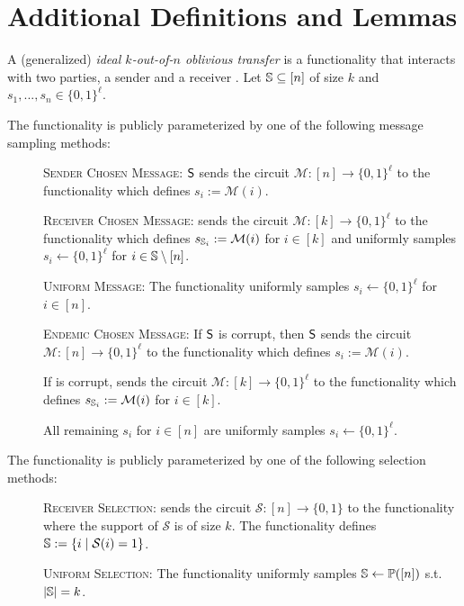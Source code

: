 \section{Additional Definitions and Lemmas}



\begin{definition}\label{def:got}
	A (generalized) \emph{ideal $k$-out-of-$n$ oblivious transfer} is a functionality that interacts with two parties, a sender \send and a receiver \rec. Let $\mathsf{\mathbb S}\subseteq[n]$ of size $k$ and  $s_1,...,s_n\in \{0,1\}^\ell$.
	
	The functionality is publicly parameterized by one of the following message sampling methods:
	\begin{description}
		\item[] \textsc{Sender Chosen Message:} $\mathsf{S}$ sends the circuit $\mathcal{M} : [n] \rightarrow \{0,1\}^\ell$ to the functionality which defines $s_i:=\mathcal{M}(i)$.
		
		\item[] \textsc{Receiver Chosen Message:} \rec sends the circuit  $\mathcal{M} : [k] \rightarrow \{0,1\}^\ell$ to the functionality which defines $s_{\mathsf{\mathbb S}_i}:=\mathcal{M}(i)$ for $i\in[k]$ and uniformly samples $s_i\gets\{0,1\}^\ell$ for $i\in\mathsf{\mathbb S}\setminus[n]$.
		
		\item[] \textsc{Uniform Message:} The functionality uniformly samples $s_i\gets\{0,1\}^{\ell}$ for $i\in[n]$. 
		
		\item[] \textsc{Endemic Chosen Message:} If $\mathsf{S}$ is corrupt, then $\mathsf{S}$ sends the circuit $\mathcal{M} : [n] \rightarrow \{0,1\}^\ell$ to the functionality which defines $s_i:=\mathcal{M}(i)$.
		
		If \rec is corrupt, \rec sends the circuit  $\mathcal{M} : [k] \rightarrow \{0,1\}^\ell$ to the functionality which defines $s_{\mathsf{\mathbb S}_i}:=\mathcal{M}(i)$ for $i\in[k]$.
		
		All remaining $s_i$ for $i\in [n]$ are uniformly samples $s_i\gets\{0,1\}^\ell$.
	\end{description}
	
	The functionality is publicly parameterized by one of the following selection methods:
	\begin{description}
		\item[] \textsc{Receiver Selection:} \rec sends the circuit $\mathcal{S}:[n]\rightarrow\{0,1\}$ to the functionality where the support of $\mathcal{S}$ is of size $k$. The functionality defines $\mathsf{\mathbb S}:=\{i \mid \mathcal{S}(i)=1\}$.
		\item[] \textsc{Uniform Selection:} The functionality uniformly samples $\mathsf{\mathbb S}\gets\mathbb{P}([n])$ s.t. $|\mathsf{\mathbb S}|=k$.
	\end{description}
	

\end{definition}

